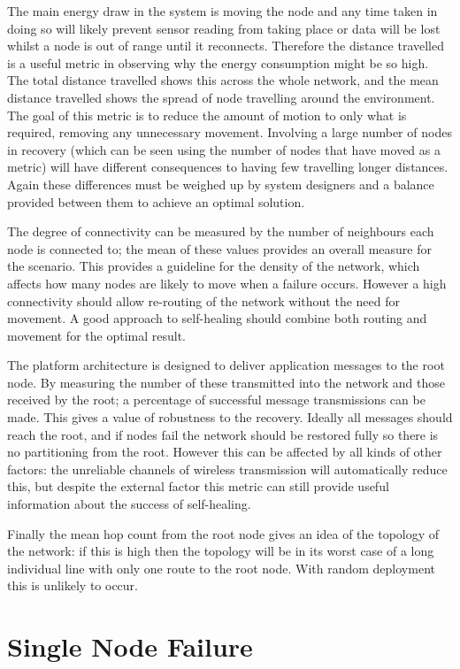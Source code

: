 \documentclass[authoryearcitations]{UoYCSproject}
\begin{document}
The main energy draw in the system is moving the node and any time taken in doing so will likely prevent sensor reading from taking place or data will be lost whilst a node is out of range until it reconnects. Therefore the distance travelled is a useful metric in observing why the energy consumption might be so high. The total distance travelled shows this across the whole network, and the mean distance travelled shows the spread of node travelling around the environment. The goal of this metric is to reduce the amount of motion to only what is required, removing any unnecessary movement. Involving a large number of nodes in recovery (which can be seen using the number of nodes that have moved as a metric) will have different consequences to having few travelling longer distances. Again these differences must be weighed up by system designers and a balance provided between them to achieve an optimal solution.

The degree of connectivity can be measured by the number of neighbours each node is connected to; the mean of these values provides an overall measure for the scenario. This provides a guideline for the density of the network, which affects how many nodes are likely to move when a failure occurs. However a high connectivity should allow re-routing of the network without the need for movement. A good approach to self-healing should combine both routing and movement for the optimal result.

The platform architecture is designed to deliver application messages to the root node. By measuring the number of these transmitted into the network and those received by the root; a percentage of successful message transmissions can be made. This gives a value of robustness to the recovery. Ideally all messages should reach the root, and if nodes fail the network should be restored fully so there is no partitioning from the root. However this can be affected by all kinds of other factors: the unreliable channels of wireless transmission will automatically reduce this, but despite the external factor this metric can still provide useful information about the success of self-healing.

Finally the mean hop count from the root node gives an idea of the topology of the network: if this is high then the topology will be in its worst case of a long individual line with only one route to the root node. With random deployment this is unlikely to occur.

\section{Single Node Failure}
\end{document}
